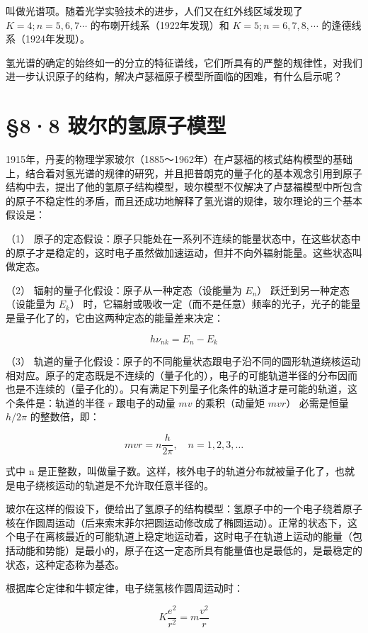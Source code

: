 叫做光谱项。随着光学实验技术的进步，人们又在红外线区域发现了
\(K = 4; n = 5, 6, 7 \cdots\) 的布喇开线系（1922年发现）和
\(K = 5; n = 6, 7, 8, \cdots\) 的逢德线系（1924年发现）。

氢光谱的确定的始终如一的分立的特征谱线，它们所具有的严整的规律性，对我们进一步认识原子的结构，解决卢瑟福原子模型所面临的困难，有什么启示呢？

\section{§8·8
玻尔的氢原子模型}

1915年，丹麦的物理学家玻尔（1885～1962年）在卢瑟福的核式结构模型的基础上，结合着对氢光谱的规律的研究，并且把普朗克的量子化的基本观念引用到原子结构中去，提出了他的氢原子结构模型，玻尔模型不仅解决了卢瑟福模型中所包含的原子不稳定性的矛盾，而且还成功地解释了氢光谱的规律，玻尔理论的三个基本假设是：

（1）
原子的定态假设：原子只能处在一系列不连续的能量状态中，在这些状态中的原子才是稳定的，这时电子虽然做加速运动，但并不向外辐射能量。这些状态叫做定态。

（2） 辐射的量子化假设：原子从一种定态（设能量为 \(E_{n}\)）
跃迁到另一种定态（设能量为 \(E_{k}\)）
时，它辐射或吸收一定（而不是任意）频率的光子，光子的能量是量子化了的，它由这两种定态的能量差来决定：

\[
h \nu_ {n k} = E _ {n} - E _ {k}
\]

（3）
轨道的量子化假设：原子的不同能量状态跟电子沿不同的圆形轨道绕核运动相对应。原子的定态既是不连续的（量子化的），电子的可能轨道半径的分布因而也是不连续的（量子化的）。只有满足下列量子化条件的轨道才是可能的轨道，这个条件是：轨道的半径
\(r\) 跟电子的动量 \(mv\) 的乘积（动量矩 \(mvr\)） 必需是恒量 \(h/2\pi\)
的整数倍，即：

\[
m v r = n \frac {h}{2 \pi}, \quad n = 1, 2, 3, \dots
\]

式中 n
是正整数，叫做量子数。这样，核外电子的轨道分布就被量子化了，也就是电子绕核运动的轨道是不允许取任意半径的。

玻尔在这样的假设下，便给出了氢原子的结构模型：氢原子中的一个电子绕着原子核在作圆周运动（后来索末菲尔把圆运动修改成了椭圆运动）。正常的状态下，这个电子在离核最近的可能轨道上稳定地运动着，这时电子在轨道上运动的能量（包括动能和势能）是最小的，原子在这一定态所具有能量值也是最低的，是最稳定的状态，这种定态称为基态。

根据库仑定律和牛顿定律，电子绕氢核作圆周运动时：

\[
K \frac {e ^ {2}}{r ^ {2}} = m \frac {v ^ {2}}{r}
\]

